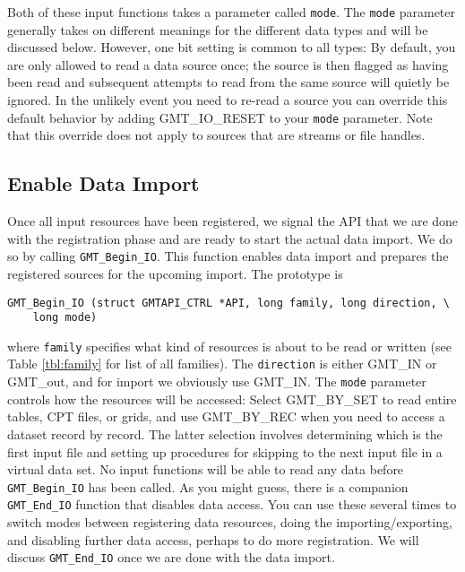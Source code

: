 \documentclass{report}
\begin{document}
Both of these input functions takes a parameter called \texttt{mode}.  The \texttt{mode} parameter generally
takes on different meanings for the different data types and will be discussed below.
However, one bit setting is common to all types: By default, you are only allowed to read a
data source once; the source is then flagged as having been read and subsequent attempts to read
from the same source will quietly be ignored.  In the unlikely event you need to re-read a
source you can override this default behavior by adding GMT\_IO\_RESET to your \texttt{mode} parameter.
Note that this override does not apply to sources that are streams or file handles.

\subsection{Enable Data Import}

Once all input resources have been registered, we signal the API that we are done with the registration
phase and are ready to start the actual data import.  We do so by calling \texttt{GMT\_Begin\_IO}.  This
function enables data import and prepares the registered sources for the upcoming import.  The prototype is

\begin{verbatim}
GMT_Begin_IO (struct GMTAPI_CTRL *API, long family, long direction, \
	long mode)
\end{verbatim}
where \texttt{family} specifies what kind of resources is about to be read or written (see Table \ref{tbl:family}
for list of all families). The \texttt{direction} is either GMT\_IN or GMT\_out, and for import we obviously use GMT\_IN.
The \texttt{mode} parameter controls how the
resources will be accessed:  Select GMT\_BY\_SET to read entire tables, CPT files, or grids, and use
GMT\_BY\_REC when you need to access a dataset record by record.  The latter selection involves determining
which is the first input file and setting up procedures for skipping to the next input file in a virtual data set.
No input functions will be able to read any data before \texttt{GMT\_Begin\_IO} has been called.  As you might
guess, there is a companion \texttt{GMT\_End\_IO} function that disables data access.  You can use these several
times to switch modes between registering data resources, doing the importing/exporting, and disabling further
data access, perhaps to do more registration.  We will discuss \texttt{GMT\_End\_IO} once we are done with the data import.
\end{document}
